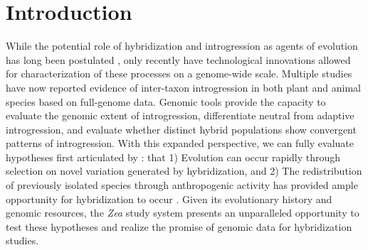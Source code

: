 
\begin{center}
\end{center}
%
%

\section*{Introduction}

While the potential role of hybridization and introgression as agents of evolution has long been postulated \citep{Anderson1948, Anderson1954, Stebbins1959}, only recently have technological innovations allowed for characterization of these processes on a genome-wide scale.
Multiple studies have now reported evidence of inter-taxon introgression in both plant \citep{Hufford2013, renaut2013} and animal \citep{consortiumbutterfly2012, staubach2012, huerta2014} species based on full-genome data.
Genomic tools provide the capacity to evaluate the genomic extent of introgression, differentiate neutral from adaptive introgression, and evaluate whether distinct hybrid populations show convergent patterns of introgression.
With this expanded perspective, we can fully evaluate hypotheses first articulated by \citet{Anderson1954}: that 1) Evolution can occur rapidly through selection on novel variation generated by hybridization, and 2) The redistribution of previously isolated species through anthropogenic activity has provided ample opportunity for hybridization to occur \citep{Anderson1954}.
Given its evolutionary history and genomic resources, the \emph{Zea} study system presents an unparalleled opportunity to test these hypotheses and realize the promise of genomic data for hybridization studies.

